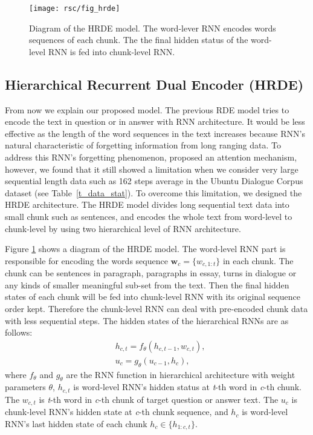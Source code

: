 \documentclass[11pt,a4paper]{article}
\begin{document}
\begin{figure}[t]
\centering
\texttt{[image: rsc/fig\_hrde]}
\caption{
Diagram of the HRDE model.
The word-lever RNN encodes words sequences of each chunk. The the final hidden status of the word-level RNN is fed into chunk-level RNN.
}
\label{fig_hrde}
\end{figure}  

\subsection{Hierarchical Recurrent Dual Encoder (HRDE)}
From now we explain our proposed model. 
The previous RDE model tries to encode the text in question or in answer with RNN architecture. It would be less effective as the length of the word sequences in the text increases because RNN's natural characteristic of forgetting information from long ranging data. 
To address this RNN's forgetting phenomenon, \cite{bahdanau2014neural} proposed an attention mechanism, however, we found that it still showed a limitation when we consider very large sequential length data such as 162 steps average in the Ubuntu Dialogue Corpus dataset (see Table~\ref{t_data_stat}). 
To overcome this limitation, we designed the HRDE architecture. The HRDE model divides long sequential text data into small chunk such as sentences, and encodes the whole text from word-level to chunk-level by using two hierarchical level of RNN architecture. 

Figure \ref{fig_hrde} shows a diagram of the HRDE model. The word-level RNN part is responsible for encoding the words sequence 
$\boldsymbol{w}_c={\{w_{c,1:t}\}}$ in each chunk.
The chunk can be sentences in paragraph, paragraphs in essay, turns in dialogue or any kinds of smaller meaningful sub-set from the text. Then the final hidden states of each chunk will be fed into chunk-level RNN with its original sequence order kept. Therefore the chunk-level RNN can deal with pre-encoded chunk data with less sequential steps. The hidden states of the hierarchical RNNs are as follows:
\begin{equation}
\begin{aligned}
 &h_{c,t} = f_{\theta}(h_{c,t-1}, w_{c,t}), \\
 &u_c = g_{\theta}(u_{c-1}, h_c),
\end{aligned}
\label{eq_hrde}
\end{equation}
where $f_\theta$ and $g_\theta$ are the RNN function in hierarchical architecture with weight parameters $\theta$, $h_{c,t}$ is word-level RNN's hidden status at \textit{t}-th word in \textit{c}-th chunk. The $w_{c,t}$ is \textit{t}-th word in \textit{c}-th chunk of target question or answer text. The $u_c$ is chunk-level RNN's hidden state at \textit{c}-th chunk sequence, and $h_c$ is word-level RNN's last hidden state of each chunk $h_c \in\{h_{1:c,t}\}$.  
\end{document}
